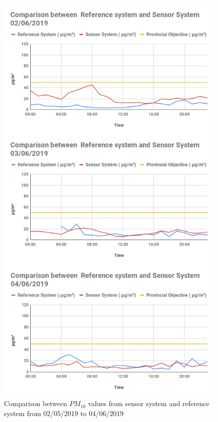 \begin{figure}[h]
  \begin{center}
  \includegraphics[scale=0.43]{images/figure98.png}
  \end{center}
  \caption{Comparison between $PM_{10}$ values from sensor system and reference system from 02/05/2019 to 04/06/2019}
\label{PM10.1}
\hspace{1 cm}
\end{figure}
\clearpage







